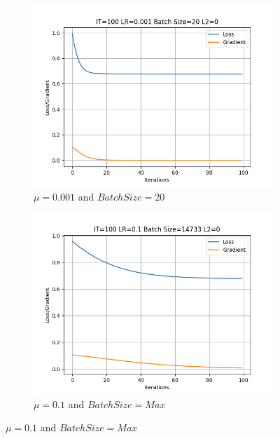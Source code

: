 \documentclass[
	letterpaper, %
	10pt, %
]{class}
\begin{document}
\begin{figure}
    \centering
    \begin{subfigure}{0.49\textwidth}
        \centering
        \includegraphics[width = \textwidth]{../data/IT=100_LR=0.001_BatchSize=20_L2=0.png}
        \caption{$\mu = 0.001$ and $Batch Size = 20$}
        \label{fig:left}
    \end{subfigure}
    \begin{subfigure}{0.49\textwidth}
        \centering
        \includegraphics[width = \textwidth]{../data/IT=100_LR=0.1_BatchSize=14733_L2=0.png}
        \caption{$\mu = 0.1 $ and $Batch Size = Max$}
        \label{fig:right}
    \end{subfigure}
    \label{fig:combined}
\end{figure}
\end{document}
